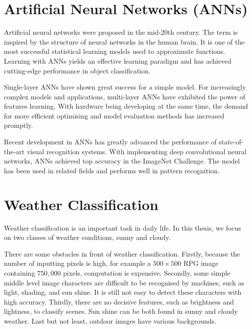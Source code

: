 \section{Artificial Neural Networks (ANNs)}

Artificial neural networks were proposed in the mid-20th century. The term is inspired by the structure of neural networks in the human brain. It is one of the most successful statistical learning models used to approximate functions. Learning with ANNs yields an effective learning paradigm and has achieved cutting-edge performance in object classification. 

Single-layer ANNs  have shown great success for a simple model. For increasingly complex models and applications, multi-layer ANNs have exhibited the power of features learning. With hardware being developing at the same time, the demand for more efficient optimising and model evaluation methods has increased promptly. 

Recent development in ANNs has greatly advanced the performance of state-of-the-art visual recognition systems. With implementing deep convolutional neural networks, ANNs achieved top accuracy in the ImageNet Challenge. The model has been used in related fields and performs well in pattern recognition.

\section{Weather Classification}

Weather classification is an important task in daily life. In this thesis, we focus on two classes of weather conditions, sunny and cloudy. 

There are some obstacles in front of weather classification. Firstly, because the number of inputting pixels is high, for example a $500 \times 500$ RPG image containing $750,000$ pixels, computation is expensive. Secondly, some simple middle level image characters are difficult to be recognised by machines, such as light, shading, and sun shine. It is still not easy to detect these characters with high accuracy. Thirdly, there are no decisive features, such as brightness and lightness, to classify scenes. Sun shine can be both found in sunny and cloudy weather. Last but not least, outdoor images have various backgrounds.


